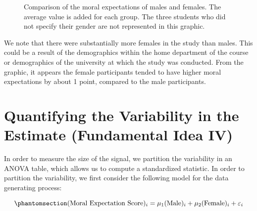 \documentclass[
  letterpaper,
  DIV=11,
  numbers=noendperiod]{scrreprt}
\theoremstyle{plain}
\theoremstyle{definition}
\theoremstyle{definition}
\theoremstyle{remark}
\begin{document}
\begin{figure}


\caption{\label{fig-anovarecap-boxplot}Comparison of the moral
expectations of males and females. The average value is added for each
group. The three students who did not specify their gender are not
represented in this graphic.}

\end{figure}%

We note that there were substantially more females in the study than
males. This could be a result of the demographics within the home
department of the course or demographics of the university at which the
study was conducted. From the graphic, it appears the female
participants tended to have higher moral expectations by about 1 point,
compared to the male participants.

\section{Quantifying the Variability in the Estimate (Fundamental Idea
IV)}\label{quantifying-the-variability-in-the-estimate-fundamental-idea-iv-1}

In order to measure the size of the signal, we partition the variability
in an ANOVA table, which allows us to compute a standardized statistic.
In order to partition the variability, we first consider the following
model for the data generating process:

\begin{equation}\phantomsection\label{eq-anovarecap-model}{(\text{Moral Expectation Score})_i = \mu_1(\text{Male})_i + \mu_2 (\text{Female})_i + \varepsilon_i}\end{equation}
\end{document}
